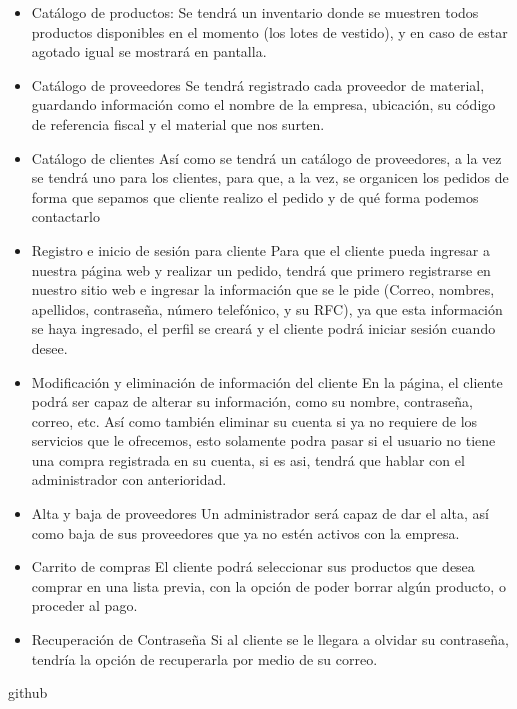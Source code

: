 \documentclass[12pt,a4paper]{article}
\begin{document}
\begin{multicols}{2}
\begin{itemize}
			\item Catálogo de productos:
			\subitem Se tendrá un inventario donde se
			muestren todos productos disponibles
			en el momento (los lotes de vestido), y
			en caso de estar agotado igual se
			mostrará en pantalla.
			
			\item Catálogo de proveedores
			\subitem Se tendrá registrado cada proveedor de
			material, guardando información como
			el nombre de la empresa, ubicación, su
			código de referencia fiscal y el material
			que nos surten.
			
			\item Catálogo de clientes
			\subitem Así como se tendrá un catálogo de
			proveedores, a la vez se tendrá uno
			para los clientes, para que, a la vez, se
			organicen los pedidos de forma que
			sepamos que cliente realizo el pedido y
			de qué forma podemos contactarlo
			
			\item Registro e inicio de sesión para cliente
			\subitem Para que el cliente pueda ingresar a
			nuestra página web y realizar un
			pedido, tendrá que primero registrarse
			en nuestro sitio web e ingresar la
			información que se le pide (Correo,
			nombres, apellidos, contraseña,
			número telefónico, y su RFC), ya que
			esta información se haya ingresado, el
			perfil se creará y el cliente podrá iniciar
			sesión cuando desee.
			
			\item Modificación y eliminación de
			información del cliente
			\subitem En la página, el cliente podrá ser capaz
			de alterar su información, como su
			nombre, contraseña, correo, etc. Así
			como también eliminar su cuenta si ya
			no requiere de los servicios que le
			ofrecemos, esto solamente podra pasar
			si el usuario no tiene una compra
			registrada en su cuenta, si es asi,
			tendrá que hablar con el administrador
			con anterioridad.
			
			\item Alta y baja de proveedores
			\subitem Un administrador será capaz de dar el
			alta, así como baja de sus proveedores
			que ya no estén activos con la empresa.
			
			\item Carrito de compras
			\subitem El cliente podrá seleccionar sus
			productos que desea comprar en una
			lista previa, con la opción de poder
			borrar algún producto, o proceder al
			pago.
			
			\item Recuperación de Contraseña
			\subitem Si al cliente se le llegara a olvidar su
			contraseña, tendría la opción de
			recuperarla por medio de su correo.
			
			
		\end{itemize}github
		
	\end{multicols} 
	
\end{document}
